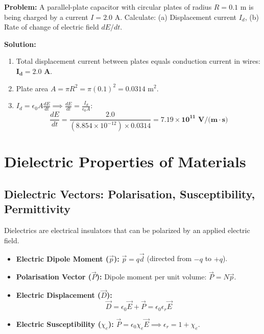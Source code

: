 \documentclass[12pt,a4paper]{article}
\begin{document}
\begin{tcolorbox}[examplebox, title={\textbf{Solved Problem 1: Displacement Current in a Capacitor}}]
\textbf{Problem:} A parallel-plate capacitor with circular plates of radius $R = 0.1\text{ m}$ is being charged by a current $I = 2.0\text{ A}$. Calculate: (a) Displacement current $I_d$, (b) Rate of change of electric field $dE/dt$.

\textbf{Solution:}\par\noindent
\begin{enumerate}[leftmargin=*, itemsep=2pt]
  \item Total displacement current between plates equals conduction current in wires: $\mathbf{I_d = 2.0\text{ A}}$.
  \item Plate area $A = \pi R^2 = \pi (0.1)^2 = 0.0314\text{ m}^2$.
  \item $I_d = \epsilon_0 A \frac{dE}{dt} \implies \frac{dE}{dt} = \frac{I_d}{\epsilon_0 A}$:
   \begin{equation}
   \frac{dE}{dt} = \frac{2.0}{(8.854 \times 10^{-12}) \times 0.0314} = \mathbf{7.19 \times 10^{11}\text{ V/(m}\cdot\text{s)}}
   \end{equation}
\end{enumerate}
\end{tcolorbox}

\section{Dielectric Properties of Materials}

\subsection{Dielectric Vectors: Polarisation, Susceptibility, Permittivity}

Dielectrics are electrical insulators that can be polarized by an applied electric field.

\begin{tcolorbox}[formulabox, title={\textbf{Fundamental Dielectric Relations}}]
\begin{itemize}[leftmargin=*, itemsep=3pt]
  \item \textbf{Electric Dipole Moment ($\vec{p}$):} $\vec{p} = q \vec{d}$ (directed from $-q$ to $+q$).
  \item \textbf{Polarisation Vector ($\vec{P}$):} Dipole moment per unit volume: $\vec{P} = N \vec{p}$.
  \item \textbf{Electric Displacement ($\vec{D}$):}
  \begin{equation}
  \vec{D} = \epsilon_0 \vec{E} + \vec{P} = \epsilon_0 \epsilon_r \vec{E}
  \end{equation}
  \item \textbf{Electric Susceptibility ($\chi_e$):} $\vec{P} = \epsilon_0 \chi_e \vec{E} \implies \epsilon_r = 1 + \chi_e$.
\end{itemize}
\end{tcolorbox}
\end{document}
